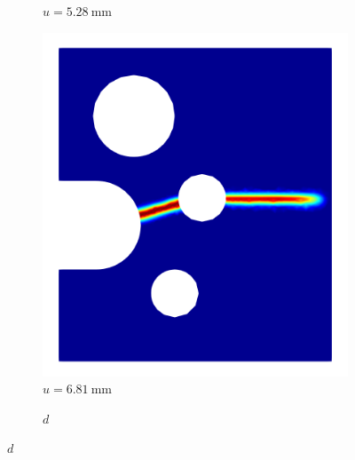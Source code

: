 \begin{figure}[!htb]
\begin{subfigure}{0.17\textwidth}
    \caption{$u = \SI{5.28}{\milli\meter}$}
    \label{fig: Chapter5/SFC/d_2}
  \end{subfigure}
  \hspace{0.03\textwidth}
  \begin{subfigure}{0.17\textwidth}
    \centering
    \includegraphics[width=\textwidth,scale=0.5]{Chapter5/figures/SFC/d_3}
    \caption{$u = \SI{6.81}{\milli\meter}$}
    \label{fig: Chapter5/SFC/d_3}
  \end{subfigure}
  \begin{subfigure}{0.04\textwidth}
    \centering
    \caption*{$d$}

\end{subfigure}
\end{figure}
